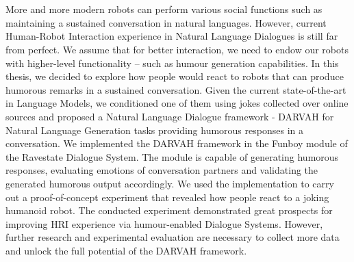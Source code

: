\chapter{\abstractname}

More and more modern robots can perform various social functions such as maintaining a sustained conversation in natural languages. However, current Human-Robot Interaction experience in Natural Language Dialogues is still far from perfect. We assume that for better interaction, we need to endow our robots with higher-level functionality – such as humour generation capabilities.
In this thesis, we decided to explore how people would react to robots that can produce humorous remarks in a sustained conversation. Given the current state-of-the-art in Language Models, we conditioned one of them using jokes collected over online sources and proposed a Natural Language Dialogue framework - DARVAH for Natural Language Generation tasks providing humorous responses in a conversation. We implemented the DARVAH framework in the Funboy module of the Ravestate Dialogue System. The module is capable of generating humorous responses, evaluating emotions of conversation partners and validating the generated humorous output accordingly. We used the implementation to carry out a proof-of-concept experiment that revealed how people react to a joking humanoid robot. 
The conducted experiment demonstrated great prospects for improving HRI experience via humour-enabled Dialogue Systems. However, further research and experimental evaluation are necessary to collect more data and unlock the full potential of the DARVAH framework.

\makeatletter
{}
{\renewcommand{\abstractname}{Abstract}}
\makeatother